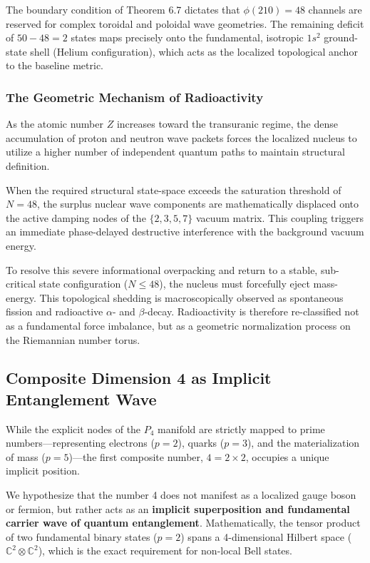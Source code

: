\documentclass[11pt,a4paper]{article}
\theoremstyle{plain}
\theoremstyle{definition}
\theoremstyle{remark}
\begin{document}
The boundary condition of Theorem 6.7 dictates that $\phi(210) = 48$ channels are reserved for complex toroidal and poloidal wave geometries. The remaining deficit of $50 - 48 = 2$ states maps precisely onto the fundamental, isotropic $1s^2$ ground-state shell (Helium configuration), which acts as the localized topological anchor to the baseline metric.

\subsubsection{The Geometric Mechanism of Radioactivity}
As the atomic number $Z$ increases toward the transuranic regime, the dense accumulation of proton and neutron wave packets forces the localized nucleus to utilize a higher number of independent quantum paths to maintain structural definition. 

When the required structural state-space exceeds the saturation threshold of $N = 48$, the surplus nuclear wave components are mathematically displaced onto the active damping nodes of the $\{2, 3, 5, 7\}$ vacuum matrix. This coupling triggers an immediate phase-delayed destructive interference with the background vacuum energy. 

To resolve this severe informational overpacking and return to a stable, sub-critical state configuration ($N \le 48$), the nucleus must forcefully eject mass-energy. This topological shedding is macroscopically observed as spontaneous fission and radioactive $\alpha$- and $\beta$-decay. Radioactivity is therefore re-classified not as a fundamental force imbalance, but as a geometric normalization process on the Riemannian number torus.
\newpage
\subsection{Composite Dimension 4 as Implicit Entanglement Wave}
While the explicit nodes of the $P_4$ manifold are strictly mapped to prime numbers—representing electrons ($p=2$), quarks ($p=3$), and the materialization of mass ($p=5$)—the first composite number, $4 = 2 \times 2$, occupies a unique implicit position. 

We hypothesize that the number 4 does not manifest as a localized gauge boson or fermion, but rather acts as an \textbf{implicit superposition and fundamental carrier wave of quantum entanglement}. Mathematically, the tensor product of two fundamental binary states ($p=2$) spans a 4-dimensional Hilbert space ($\mathbb{C}^2 \otimes \mathbb{C}^2$), which is the exact requirement for non-local Bell states. 
\end{document}
